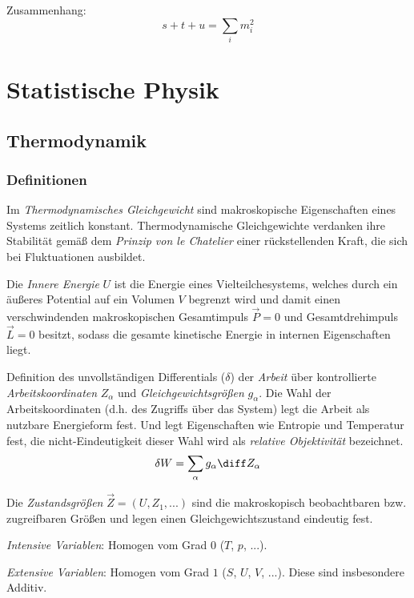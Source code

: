 \documentclass[11pt]{article}
\numberwithin{equation}{section}
\begin{document}
        Zusammenhang:
        \begin{equation}
          s+t+u = \sum_i m_i^2
        \end{equation}




  \newpage
  \section{Statistische Physik}
    \subsection{Thermodynamik}
      \subsubsection{Definitionen}
        Im \emph{Thermodynamisches Gleichgewicht} sind makroskopische Eigenschaften eines Systems zeitlich konstant. Thermodynamische Gleichgewichte verdanken ihre Stabilität gemäß dem \emph{Prinzip von le Chatelier} einer rückstellenden Kraft, die sich bei Fluktuationen ausbildet. \vsp

        Die \emph{Innere Energie} $U$ ist die Energie eines Vielteilchesystems, welches durch ein äußeres Potential auf ein Volumen $V$ begrenzt wird und damit einen verschwindenden makroskopischen Gesamtimpuls $\vec{P}=0$ und Gesamtdrehimpuls $\vec{L} = 0$ besitzt, sodass die gesamte kinetische Energie in internen Eigenschaften liegt. \vsp

        Definition des unvollständigen Differentials ($\delta$) der \emph{Arbeit} über kontrollierte \emph{Arbeitskoordinaten} $Z_\alpha$ und \emph{Gleichgewichtsgrößen} $g_\alpha$. Die Wahl der Arbeitskoordinaten (d.h. des Zugriffs über das System) legt die Arbeit als nutzbare Energieform fest. Und legt Eigenschaften wie Entropie und Temperatur fest, die nicht-Eindeutigkeit dieser Wahl wird als \emph{relative Objektivität} bezeichnet.
        \begin{equation}
          \delta W = \sum_\alpha g_\alpha \diff Z_\alpha
        \end{equation} \vsp

        Die \emph{Zustandsgrößen} $\vec{Z}=\left(U, Z_1,... \right)$ sind die makroskopisch beobachtbaren bzw. zugreifbaren Größen und legen einen Gleichgewichtszustand eindeutig fest. \vsp

        \emph{Intensive Variablen}: Homogen vom Grad $0$ ($T$, $p$, ...). \vsp

        \emph{Extensive Variablen}: Homogen vom Grad $1$ ($S$, $U$, $V$, ...). Diese sind insbesondere Additiv. \vsp
\end{document}
